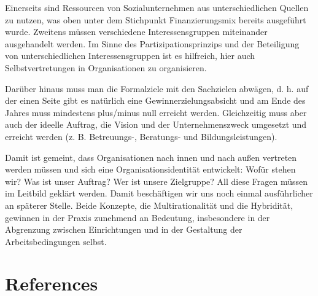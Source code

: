 \documentclass[
  letterpaper,
]{book}
\begin{document}
Einerseits sind Ressourcen von Sozialunternehmen aus unterschiedlichen
Quellen zu nutzen, was oben unter dem Stichpunkt Finanzierungsmix
bereits ausgeführt wurde. Zweitens müssen verschiedene
Interessensgruppen miteinander ausgehandelt werden. Im Sinne des
Partizipationsprinzips und der Beteiligung von unterschiedlichen
Interessensgruppen ist es hilfreich, hier auch Selbstvertretungen in
Organisationen zu organisieren.

Darüber hinaus muss man die Formalziele mit den Sachzielen abwägen, d.
h. auf der einen Seite gibt es natürlich eine Gewinnerzielungsabsicht
und am Ende des Jahres muss mindestens plus/minus null erreicht werden.
Gleichzeitig muss aber auch der ideelle Auftrag, die Vision und der
Unternehmenszweck umgesetzt und erreicht werden (z. B. Betreuungs-,
Beratungs- und Bildungsleistungen).

Damit ist gemeint, dass Organisationen nach innen und nach außen
vertreten werden müssen und sich eine Organisationsidentität entwickelt:
Wofür stehen wir? Was ist unser Auftrag? Wer ist unsere Zielgruppe? All
diese Fragen müssen im Leitbild geklärt werden. Damit beschäftigen wir
uns noch einmal ausführlicher an späterer Stelle. Beide Konzepte, die
Multirationalität und die Hybridität, gewinnen in der Praxis zunehmend
an Bedeutung, insbesondere in der Abgrenzung zwischen Einrichtungen und
in der Gestaltung der Arbeitsbedingungen selbst.

\cleardoublepage
{}
{}
\appendix

\chapter{References}\label{references}
\end{document}
